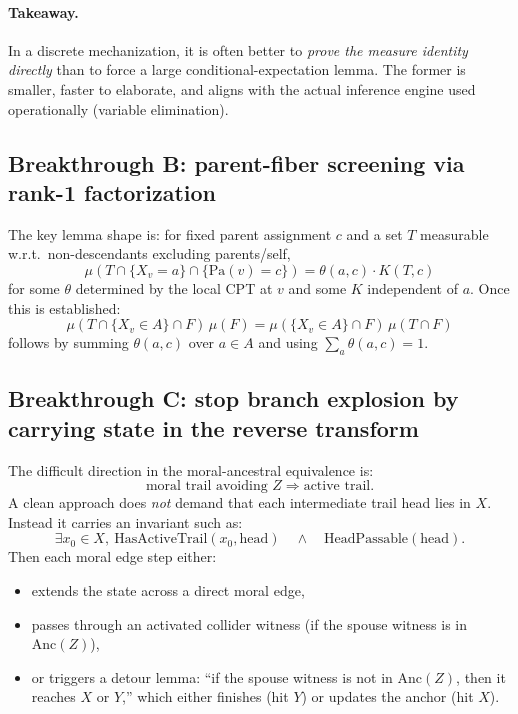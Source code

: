 \documentclass[11pt]{article}
\begin{document}
\paragraph{Takeaway.}
In a discrete mechanization, it is often better to \emph{prove the measure identity directly}
than to force a large conditional-expectation lemma. The former is smaller, faster to elaborate,
and aligns with the actual inference engine used operationally (variable elimination).

\subsection{Breakthrough B: parent-fiber screening via rank-1 factorization}

The key lemma shape is:
for fixed parent assignment $c$ and a set $T$ measurable w.r.t.\ non-descendants excluding parents/self,
\[
  \mu(T \cap \{X_v=a\} \cap \{\mathrm{Pa}(v)=c\}) = \theta(a,c)\cdot K(T,c)
\]
for some $\theta$ determined by the local CPT at $v$ and some $K$ independent of $a$.
Once this is established:
\[
  \mu(T \cap \{X_v\in A\}\cap F)\,\mu(F) = \mu(\{X_v\in A\}\cap F)\,\mu(T\cap F)
\]
follows by summing $\theta(a,c)$ over $a\in A$ and using $\sum_a \theta(a,c)=1$.

\subsection{Breakthrough C: stop branch explosion by carrying state in the reverse transform}

The difficult direction in the moral-ancestral equivalence is:
\[
  \text{moral trail avoiding } Z \Rightarrow \text{active trail}.
\]
A clean approach does \emph{not} demand that each intermediate trail head lies in $X$.
Instead it carries an invariant such as:
\[
  \exists x_0\in X,\ \text{HasActiveTrail}(x_0,\text{head}) \quad \wedge \quad \text{HeadPassable}(\text{head}).
\]
Then each moral edge step either:
\begin{itemize}[leftmargin=2em]
\item extends the state across a direct moral edge,
\item passes through an activated collider witness (if the spouse witness is in $\mathrm{Anc}(Z)$),
\item or triggers a detour lemma: ``if the spouse witness is not in $\mathrm{Anc}(Z)$, then it reaches $X$ or $Y$,''
which either finishes (hit $Y$) or updates the anchor (hit $X$).
\end{itemize}
\end{document}
